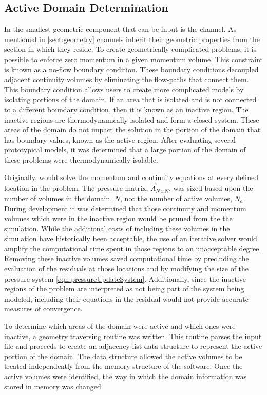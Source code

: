 \subsection{Active Domain Determination}
\label{subsect:activeDomainDetermination}
In \cobra{} the smallest geometric component that can be input is the channel.
As mentioned in \ref{sect:geometry} channels inherit their geometric properties from the section in which they reside.
To create geometrically complicated problems, it is possible to enforce zero momentum in a given momentum volume.
This constraint is known as a no-flow boundary condition.
These boundary conditions decoupled adjacent continuity volumes by eliminating the flow-paths that connect them.
This boundary condition allows users to create more complicated models by isolating portions of the domain.
If an area that is isolated and is not connected to a different boundary condition, then it is known as an inactive region.
The inactive regions are thermodynamically isolated and form a closed system.
These areas of the domain do not impact the solution in the portion of the domain that has boundary values, known as the active region.
After evaluating several prototypical models, it was determined that a large portion of the domain of these problems were thermodynamically isolable.


Originally, \cobra{} would solve the momentum and continuity equations at every defined location in the problem.
The pressure matrix, $\vec{A}_{N\,x\,N}$, was sized based upon the number of volumes in the domain, $N$, not the number of active volumes, $N_{a}$.
During development it was determined that those continuity and momentum volumes which were in the inactive region would be pruned from the the simulation.
While the additional costs of including these volumes in the simulation have historically been acceptable, the use of an iterative solver would amplify the computational time spent in those regions to an unacceptable degree.
Removing these inactive volumes saved computational time by precluding the evaluation of the residuals at those locations and by modifying the size of the pressure system \eqref{eqn:pressureUpdateSystem}.
Additionally, since the inactive regions of the problem are interpreted as not being part of the system being modeled, including their equations in the residual would not provide accurate measures of convergence.

To determine which areas of the domain were active and which ones were inactive, a geometry traversing routine was written.
This routine parses the input file and proceeds to create an adjacency list data structure to represent the active portion of the domain.
The data structure allowed the active volumes to be treated independently from the memory structure of the software.
Once the active volumes were identified, the way in which the domain information was stored in memory was changed.

